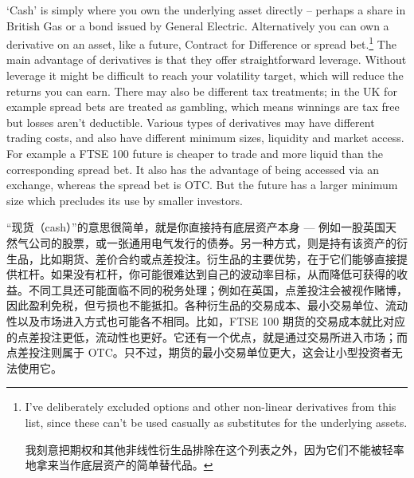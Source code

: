 \begin{englishblock} ‘Cash' is simply where you own the underlying asset directly -- perhaps a share in British Gas or a bond issued by General Electric. Alternatively you can own a derivative on an asset, like a future, Contract for Difference or spread bet.\footnote{I've deliberately excluded options and other non-linear derivatives from this list, since these can't be used casually as substitutes for the underlying assets. \par 我刻意把期权和其他非线性衍生品排除在这个列表之外，因为它们不能被轻率地拿来当作底层资产的简单替代品。} The main advantage of derivatives is that they offer straightforward leverage. Without leverage it might be difficult to reach your volatility target, which will reduce the returns you can earn. There may also be different tax treatments; in the UK for example spread bets are treated as gambling, which means winnings are tax free but losses aren't deductible. Various types of derivatives may have different trading costs, and also have different minimum sizes, liquidity and market access. For example a FTSE 100 future is cheaper to trade and more liquid than the corresponding spread bet. It also has the advantage of being accessed via an exchange, whereas the spread bet is OTC. But the future has a larger minimum size which precludes its use by smaller investors. \end{englishblock}

\begin{chineseblock}“现货（cash）”的意思很简单，就是你直接持有底层资产本身 --- 例如一股英国天然气公司的股票，或一张通用电气发行的债券。另一种方式，则是持有该资产的衍生品，比如期货、差价合约或点差投注。衍生品的主要优势，在于它们能够直接提供杠杆。如果没有杠杆，你可能很难达到自己的波动率目标，从而降低可获得的收益。不同工具还可能面临不同的税务处理；例如在英国，点差投注会被视作赌博，因此盈利免税，但亏损也不能抵扣。各种衍生品的交易成本、最小交易单位、流动性以及市场进入方式也可能各不相同。比如，FTSE 100 期货的交易成本就比对应的点差投注更低，流动性也更好。它还有一个优点，就是通过交易所进入市场；而点差投注则属于 OTC。只不过，期货的最小交易单位更大，这会让小型投资者无法使用它。\end{chineseblock}


